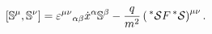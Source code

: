 \begin{equation}
\left[ \Bbb{S}^{\mu },\Bbb{S}^{\nu }\right] =\varepsilon ^{\mu \nu
}{}_{\alpha \beta }\dot{x}^{\alpha }\Bbb{S}^{\beta }-\frac{q}{m^{2}}\left(
\,^{*}\mathcal{S}F\,^{*}\mathcal{S}\right) ^{\mu \nu }.
\end{equation}

